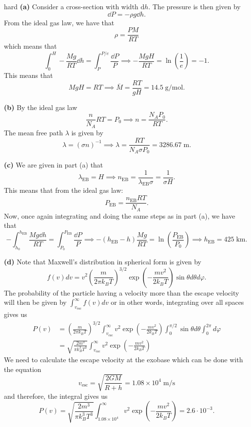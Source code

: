 \begin{solution}{hard} \textbf{(a)} Consider a cross-section with width $\text{d}h$. The pressure is then given by 
\[\dd P = - \rho g \dd h.\]
From the ideal gas law, we have that 
\[\rho = \frac{PM}{RT}\]
which means that 
\[\int_{0}^{H} -\frac{Mg}{RT}\dd h = \int_{P}^{P/e} \frac{\dd P}{P}\implies - \frac{MgH}{RT} = \ln \left(\frac{1}{e}\right) = -1.\]
This means that 
\[MgH = RT\implies \bar{M} = \frac{RT}{gH} = 14.5\;\mathrm{g/mol}.\]
\vspace{3mm}

\noindent \textbf{(b)} By the ideal gas law 
\[\frac{n}{N_A}RT = P_0\implies n = \frac{N_A P_0}{RT}.\]
The mean free path $\lambda$ is given by 
\[\lambda = (\sigma n)^{-1}\implies \lambda = \frac{RT}{N_A \sigma P_0} = 3286.67\;\mathrm{m}.\]
\vspace{3mm}

\noindent \textbf{(c)} We are given in part (a) that 
\[\lambda_{\text{EB}} = H \implies n_{\text{EB}} = \frac{1}{\lambda_{\text{EB}} \sigma} = \frac{1}{\sigma H}.\]
This means that from the ideal gas law:
\[P_{\text{EB}} = \frac{n_{\text{EB}} RT}{N_A}.\]
Now, once again integrating and doing the same steps as in part (a), we have that 
\[-\int_{h_0}^{h_{\text{EB}}} \frac{Mg \dd h}{RT} = \int_{P_0}^{P_{\text{EB}}} \frac{\dd P}{P}\implies -(h_{\text{EB}} - h )\frac{Mg}{RT} = \ln \left(\frac{P_{\text{EB}}}{P_0}\right)\implies h_{\text{EB}} = 425\;\mathrm{km}.\]
\vspace{3mm}

\noindent \textbf{(d)} Note that Maxwell's distribution in spherical form is given by 
\[f(v) dv = v^2 \left(\frac{m}{2\pi k_B T}\right)^{3/2} \exp \left(-\frac{mv^2}{2k_B T}\right) \sin\theta d\theta d\varphi.\]
The probability of the particle having a velocity more than the escape velocity will then be given by $\int_{v_{\text{esc}}}^{\infty} f(v) dv$ or in other words, integrating over all spaces gives us 
\begin{align*}
P(v) &= \left(\frac{m}{2\pi k_B T}\right)^{3/2} \int_{v_{\text{esc}}}^{\infty} v^2 \exp \left(-\frac{mv^2}{2k_B T}\right) \int_{0}^{\pi/2} \sin\theta d\theta \int_{0}^{2\pi} d\varphi\\
&= \sqrt{\frac{2m^3}{\pi k_B^3T^3}} \int_{v_{\text{esc}}}^{\infty} v^2 \exp \left(-\frac{mv^2}{2k_B T}\right)
\end{align*}
We need to calculate the escape velocity at the exobase which can be done with the equation 
\[v_{\text{esc}} = \sqrt{\frac{2GM}{R + h}} = 1.08\times 10^4 \;\mathrm{m/s}\]
and therefore, the integral gives us
\[P(v) = \sqrt{\frac{2m^3}{\pi k_B^3T^3}} \int_{1.08\times 10^4}^{\infty} v^2 \exp \left(-\frac{mv^2}{2k_B T}\right) = \boxed{2.6\cdot 10^{-3}}.\]
\vspace{3mm}


\end{solution}
